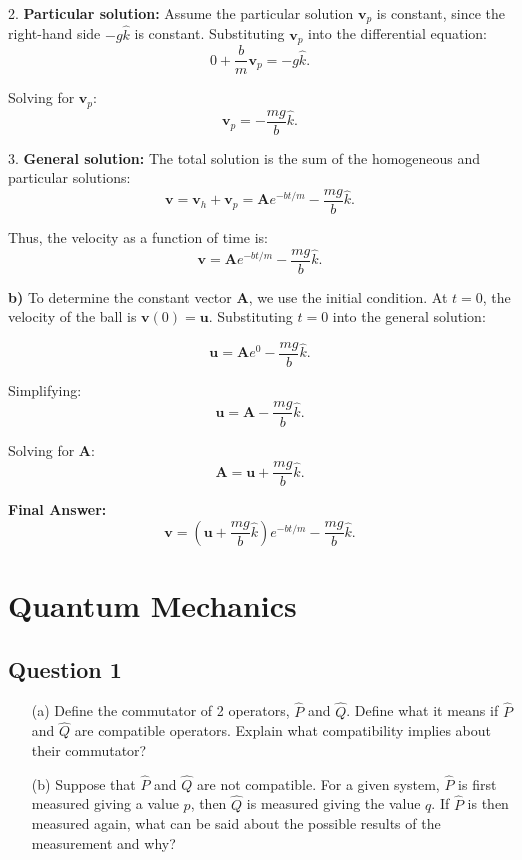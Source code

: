 \documentclass{article}
\begin{document}
2. \textbf{Particular solution:} Assume the particular solution $\mathbf{v}_p$ is constant, since the right-hand side $-g\hat{k}$ is constant. Substituting $\mathbf{v}_p$ into the differential equation:
\[
0 + \frac{b}{m} \mathbf{v}_p = -g\hat{k}.
\]

Solving for $\mathbf{v}_p$:
\[
\mathbf{v}_p = -\frac{mg}{b} \hat{k}.
\]

3. \textbf{General solution:} The total solution is the sum of the homogeneous and particular solutions:
\[
\mathbf{v} = \mathbf{v}_h + \mathbf{v}_p = \mathbf{A} e^{-bt/m} - \frac{mg}{b} \hat{k}.
\]

Thus, the velocity as a function of time is:
\[
\mathbf{v} = \mathbf{A} e^{-bt/m} - \frac{mg}{b} \hat{k}.
\]

\textbf{b)} To determine the constant vector $\mathbf{A}$, we use the initial condition. At $t = 0$, the velocity of the ball is $\mathbf{v}(0) = \mathbf{u}$. Substituting $t = 0$ into the general solution:

\[
\mathbf{u} = \mathbf{A} e^{0} - \frac{mg}{b} \hat{k}.
\]

Simplifying:
\[
\mathbf{u} = \mathbf{A} - \frac{mg}{b} \hat{k}.
\]

Solving for $\mathbf{A}$:
\[
\mathbf{A} = \mathbf{u} + \frac{mg}{b} \hat{k}.
\]

\textbf{Final Answer:}
\[
\mathbf{v} = \left( \mathbf{u} + \frac{mg}{b} \hat{k} \right) e^{-bt/m} - \frac{mg}{b} \hat{k}.
\]

\section{Quantum Mechanics}

\subsection{Question 1}

\begin{enumerate}
    \item[(a)] Define the commutator of 2 operators, $\hat{P}$ and $\hat{Q}$. Define what it means if $\hat{P}$ and $\hat{Q}$ are compatible operators. Explain what compatibility implies about their commutator?
    \item[(b)] Suppose that $\hat{P}$ and $\hat{Q}$ are not compatible. For a given system, $\hat{P}$ is first measured giving a value $p$, then $\hat{Q}$ is measured giving the value $q$. If $\hat{P}$ is then measured again, what can be said about the possible results of the measurement and why?
\end{enumerate}
\end{document}

